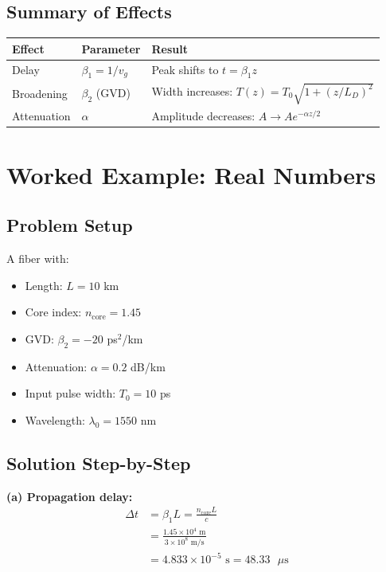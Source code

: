 \documentclass[12pt]{article}
\begin{document}
\subsection{Summary of Effects}

\begin{center}
\begin{tabular}{|l|l|l|}
\hline
\textbf{Effect} & \textbf{Parameter} & \textbf{Result} \\
\hline
Delay & $\beta_1 = 1/v_g$ & Peak shifts to $t = \beta_1 z$ \\
\hline
Broadening & $\beta_2$ (GVD) & Width increases: $T(z) = T_0\sqrt{1 + (z/L_D)^2}$ \\
\hline
Attenuation & $\alpha$ & Amplitude decreases: $A \to A e^{-\alpha z/2}$ \\
\hline
\end{tabular}
\end{center}

\section{Worked Example: Real Numbers}

\subsection{Problem Setup}

A fiber with:
\begin{itemize}
\item Length: $L = 10$ km
\item Core index: $n_{\text{core}} = 1.45$
\item GVD: $\beta_2 = -20$ ps$^2$/km
\item Attenuation: $\alpha = 0.2$ dB/km
\item Input pulse width: $T_0 = 10$ ps
\item Wavelength: $\lambda_0 = 1550$ nm
\end{itemize}

\subsection{Solution Step-by-Step}

\textbf{(a) Propagation delay:}
\begin{align}
\Delta t &= \beta_1 L = \frac{n_{\text{core}} L}{c} \\
&= \frac{1.45 \times 10^4 \text{ m}}{3 \times 10^8 \text{ m/s}} \\
&= 4.833 \times 10^{-5} \text{ s} = \boxed{48.33 \text{ }\mu\text{s}}
\end{align}
\end{document}

